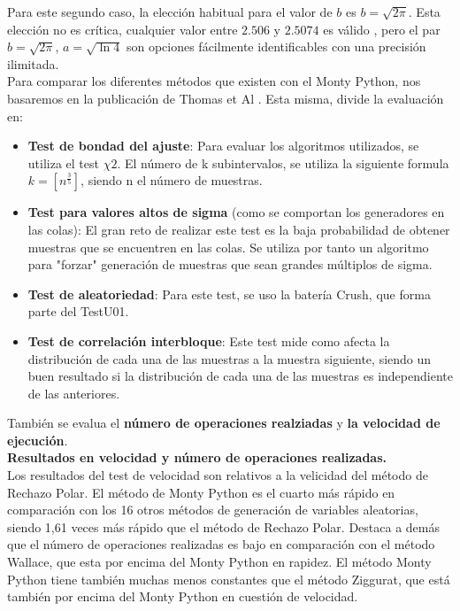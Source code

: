 \documentclass[a4paper,12pt]{article}
\begin{document}
	Para este segundo caso, la elección habitual para el valor de $b$ es $b= \sqrt{2\pi}$. Esta elección no es crítica, cualquier valor entre $2.506$ y $2.5074$ es válido \cite{monty-python}, pero el par $b=\sqrt{2\pi}$, $a = \sqrt{\ln 4}$ son opciones fácilmente identificables con una precisión ilimitada.\\
	
	
	Para comparar los diferentes métodos que existen con el Monty Python, nos basaremos en la publicación de Thomas et Al \cite{comparacion-metodos} . Esta misma, divide la evaluación en:

	
	\begin{itemize}

		\item \textbf{Test de bondad del ajuste}: Para evaluar los algoritmos utilizados, se utiliza el test $\chi{2}$. El número de k subintervalos, se utiliza la siguiente formula $k=[n^{\frac{3}{5}}]$, siendo n el número de muestras.

		\item \textbf{Test para valores altos de sigma} (como se comportan los generadores en las colas): El gran reto de realizar este test es la baja probabilidad de obtener muestras que se encuentren en las colas. Se utiliza por tanto un algoritmo para "forzar" generación de muestras que sean grandes múltiplos de sigma. 

		\item \textbf{Test de aleatoriedad}: Para este test, se uso la batería Crush, que forma parte del TestU01.

		\item \textbf{Test de correlación interbloque}: Este test mide como afecta la distribución de cada una de las muestras a la muestra siguiente, siendo un buen resultado si la distribución de cada una de las muestras es independiente de las anteriores.

	\end{itemize}

	
	También se evalua el \textbf{número de operaciones realziadas} y \textbf{la velocidad de ejecución}. \\

	
	\textbf{Resultados en velocidad y número de operaciones realizadas.}\\

	
	Los resultados del test de velocidad son relativos a la velicidad del método de Rechazo Polar. El método de Monty Python es el cuarto más rápido en comparación con los 16 otros métodos de generación de variables aleatorias, siendo 1,61 veces más rápido que el método de Rechazo Polar. Destaca a demás que el número de operaciones realizadas es bajo en comparación con el método Wallace, que esta por encima del Monty Python en rapidez. El método Monty Python tiene también muchas menos constantes que el método Ziggurat, que está también por encima del Monty Python en cuestión de velocidad.\\
\end{document}
